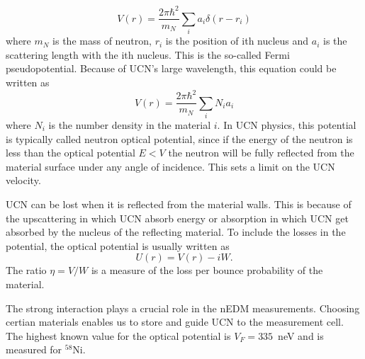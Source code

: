 \begin{equation}
  \label{eqn:vFermi}
  V(r) = \frac{2\pi \hbar^2}{m_N} \sum_i a_i \delta (r - r_i)
\end{equation}
where $m_N$ is the mass of neutron, $r_i$ is the position of ith
nucleus and $a_i$ is the scattering length with the ith nucleus. This
is the so-called Fermi pseudopotential. Because of UCN's large
wavelength, this equation could be written as
\begin{equation}
V(r) = \frac{2\pi \hbar^2}{m_N}\sum_i N_ia_i
\end{equation}
where $N_i$ is the number density in the material $i$. In UCN physics,
this potential is typically called neutron optical potential, since if
the energy of the neutron is less than the optical potential $E < V$
the neutron will be fully reflected from the material surface under
any angle of incidence. This sets a limit on the UCN velocity.

UCN can be lost when it is reflected from the material walls.
This is because of the upscattering in which UCN absorb energy or
absorption in which UCN get absorbed by the nucleus of the reflecting
material. To include the losses in the potential, the optical
potential is usually written as
\begin{equation}
  U(r) = V(r) - iW.
\end{equation}
The ratio $\eta = V/W$ is a measure of the loss per bounce probability
of the material. 

The strong interaction plays a crucial role in the nEDM
measurements. Choosing certian materials enables us to store and guide
UCN to the measurement cell.  The highest known value for the optical
potential is $V_F=335$~neV and is measured for $^{58}$Ni.





